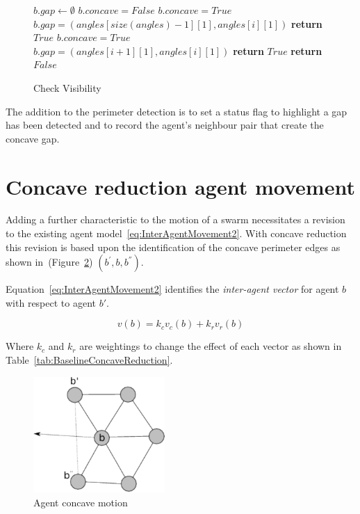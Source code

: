 \documentclass{ieeeaccess}
\begin{document}
\begin{figure}
\begin{algorithmic}
\tiny
{}
\State $b.gap \leftarrow \emptyset$
\State $b.concave = False$
				\State $b.concave = True$
				\State $b.gap = (angles[size(angles)-1][1],angles[i][1])$
			\EndIf
   		\State\textbf{return} $True$
   	\EndIf
	\EndIf
				\State $b.concave = True$\;
				\State $b.gap = (angles[i + 1][1],angles[i][1])$
		  \EndIf
		  \State\textbf{return} $True$
	\EndIf
\EndFor
\State\textbf{return} $False$
\EndProcedure
\end{algorithmic}
\caption{Check Visibility}
\label{algo:checkVisibility2}
\end{figure}

The addition to the perimeter detection is to set a status flag to highlight a gap has been detected and to record the agent's neighbour pair that create the concave gap.

\section{Concave reduction agent movement}\label{concave:AgentMovement}
Adding a further characteristic to the motion of a swarm necessitates a revision to the existing agent model~\eqref{eq:InterAgentMovement2}. With concave reduction this revision is based upon the identification of the concave perimeter edges as shown in~(Figure~\ref{concave:VoidConcave1}) $(b^{'},b,b^{''})$. 

Equation~\eqref{eq:InterAgentMovement2} identifies the \textit{inter-agent vector} for agent $b$ with respect to agent $b'$.

\begin{equation}\label{eq:InterAgentMovement2}
v(b) = k_cv_{c}(b) + k_rv_{r}(b)
\end{equation}

Where $k_c$ and $k_r$ are weightings to change the effect of each vector as shown in Table~\ref{tab:BaselineConcaveReduction}.\\

\begin{figure}
\begin{center}
\includegraphics[width=5cm]{figures/VoidConcave1}
\end{center}
\caption{Agent concave motion\label{concave:VoidConcave1}}
\end{figure}
\end{document}
